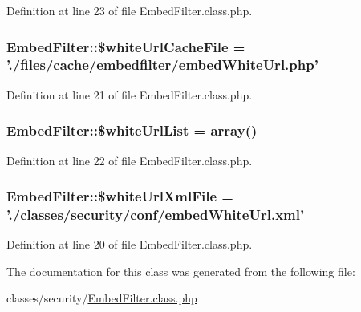 Definition at line 23 of file Embed\-Filter.\-class.\-php.

\hypertarget{classEmbedFilter_a2c04bd8059ab27b14923923317ad0756}{
\subsubsection[{\$white\-Url\-Cache\-File}]{\setlength{\rightskip}{0pt plus 5cm}Embed\-Filter\-::\$white\-Url\-Cache\-File = './files/cache/embedfilter/embed\-White\-Url.\-php'}}\label{classEmbedFilter_a2c04bd8059ab27b14923923317ad0756}


Definition at line 21 of file Embed\-Filter.\-class.\-php.

\hypertarget{classEmbedFilter_a3c991ef8c125e62213cc5c686712be8f}{
\subsubsection[{\$white\-Url\-List}]{\setlength{\rightskip}{0pt plus 5cm}Embed\-Filter\-::\$white\-Url\-List = array()}}\label{classEmbedFilter_a3c991ef8c125e62213cc5c686712be8f}


Definition at line 22 of file Embed\-Filter.\-class.\-php.

\hypertarget{classEmbedFilter_aad143e16d225c65d096f44b325744c89}{
\subsubsection[{\$white\-Url\-Xml\-File}]{\setlength{\rightskip}{0pt plus 5cm}Embed\-Filter\-::\$white\-Url\-Xml\-File = './classes/security/conf/embed\-White\-Url.\-xml'}}\label{classEmbedFilter_aad143e16d225c65d096f44b325744c89}


Definition at line 20 of file Embed\-Filter.\-class.\-php.



The documentation for this class was generated from the following file\-:\begin{DoxyCompactItemize}
\item 
classes/security/\hyperlink{EmbedFilter_8class_8php}{Embed\-Filter.\-class.\-php}\end{DoxyCompactItemize}

